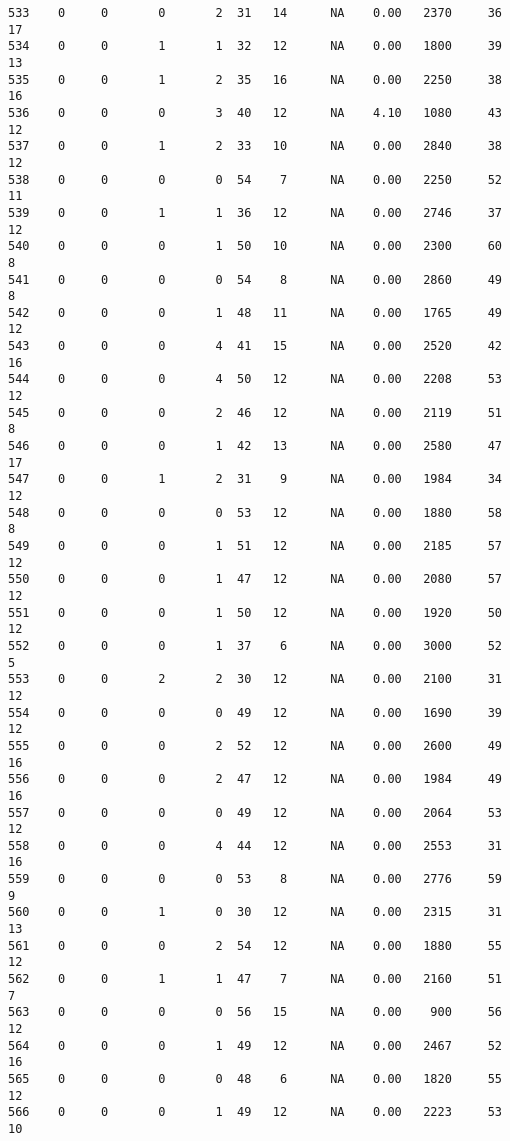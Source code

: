 \documentclass[
  letterpaper,
  DIV=11,
  numbers=noendperiod]{scrreprt}
\begin{document}
\begin{verbatim}
533    0     0       0       2  31   14      NA    0.00   2370     36      17
534    0     0       1       1  32   12      NA    0.00   1800     39      13
535    0     0       1       2  35   16      NA    0.00   2250     38      16
536    0     0       0       3  40   12      NA    4.10   1080     43      12
537    0     0       1       2  33   10      NA    0.00   2840     38      12
538    0     0       0       0  54    7      NA    0.00   2250     52      11
539    0     0       1       1  36   12      NA    0.00   2746     37      12
540    0     0       0       1  50   10      NA    0.00   2300     60       8
541    0     0       0       0  54    8      NA    0.00   2860     49       8
542    0     0       0       1  48   11      NA    0.00   1765     49      12
543    0     0       0       4  41   15      NA    0.00   2520     42      16
544    0     0       0       4  50   12      NA    0.00   2208     53      12
545    0     0       0       2  46   12      NA    0.00   2119     51       8
546    0     0       0       1  42   13      NA    0.00   2580     47      17
547    0     0       1       2  31    9      NA    0.00   1984     34      12
548    0     0       0       0  53   12      NA    0.00   1880     58       8
549    0     0       0       1  51   12      NA    0.00   2185     57      12
550    0     0       0       1  47   12      NA    0.00   2080     57      12
551    0     0       0       1  50   12      NA    0.00   1920     50      12
552    0     0       0       1  37    6      NA    0.00   3000     52       5
553    0     0       2       2  30   12      NA    0.00   2100     31      12
554    0     0       0       0  49   12      NA    0.00   1690     39      12
555    0     0       0       2  52   12      NA    0.00   2600     49      16
556    0     0       0       2  47   12      NA    0.00   1984     49      16
557    0     0       0       0  49   12      NA    0.00   2064     53      12
558    0     0       0       4  44   12      NA    0.00   2553     31      16
559    0     0       0       0  53    8      NA    0.00   2776     59       9
560    0     0       1       0  30   12      NA    0.00   2315     31      13
561    0     0       0       2  54   12      NA    0.00   1880     55      12
562    0     0       1       1  47    7      NA    0.00   2160     51       7
563    0     0       0       0  56   15      NA    0.00    900     56      12
564    0     0       0       1  49   12      NA    0.00   2467     52      16
565    0     0       0       0  48    6      NA    0.00   1820     55      12
566    0     0       0       1  49   12      NA    0.00   2223     53      10

\end{verbatim}
\end{document}
